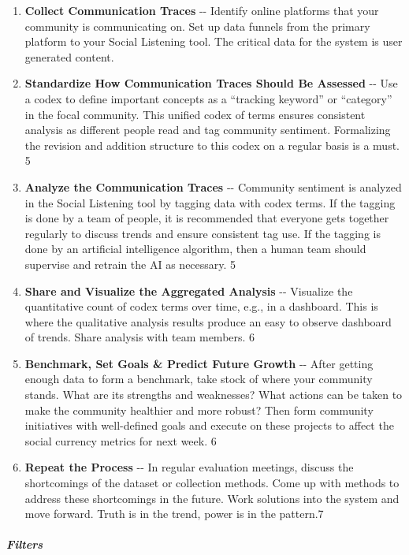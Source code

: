 \begin{enumerate}
\def\labelenumi{\arabic{enumi}.}
\item
  \textbf{Collect Communication Traces} -\/- Identify online platforms
  that your community is communicating on. Set up data funnels from the
  primary platform to your Social Listening tool. The critical data for
  the system is user generated content.
\item
  \textbf{Standardize How Communication Traces Should Be Assessed} -\/-
  Use a codex to define important concepts as a ``tracking keyword'' or
  ``category'' in the focal community. This unified codex of terms
  ensures consistent analysis as different people read and tag community
  sentiment. Formalizing the revision and addition structure to this
  codex on a regular basis is a must. 5
\item
  \textbf{Analyze the Communication Traces} -\/- Community sentiment is
  analyzed in the Social Listening tool by tagging data with codex
  terms. If the tagging is done by a team of people, it is recommended
  that everyone gets together regularly to discuss trends and ensure
  consistent tag use. If the tagging is done by an artificial
  intelligence algorithm, then a human team should supervise and retrain
  the AI as necessary. 5
\item
  \textbf{Share and Visualize the Aggregated Analysis} -\/- Visualize
  the quantitative count of codex terms over time, e.g., in a dashboard.
  This is where the qualitative analysis results produce an easy to
  observe dashboard of trends. Share analysis with team members. 6
\item
  \textbf{Benchmark, Set Goals \& Predict Future Growth} -\/- After
  getting enough data to form a benchmark, take stock of where your
  community stands. What are its strengths and weaknesses? What actions
  can be taken to make the community healthier and more robust? Then
  form community initiatives with well-defined goals and execute on
  these projects to affect the social currency metrics for next week. 6
\item
  \textbf{Repeat the Process} -\/- In regular evaluation meetings,
  discuss the shortcomings of the dataset or collection methods. Come up
  with methods to address these shortcomings in the future. Work
  solutions into the system and move forward. Truth is in the trend,
  power is in the pattern.7
\end{enumerate}

\hypertarget{filters}{%
\subparagraph{Filters}\label{filters}}

